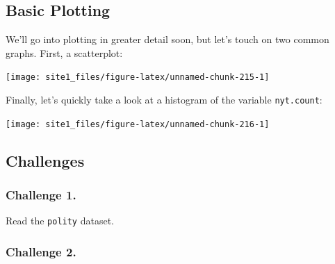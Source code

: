 \documentclass[]{book}
\newenvironment{Shaded}{\begin{snugshade}}{\end{snugshade}}
\newcommand{\DataTypeTok}[1]{\textcolor[rgb]{0.13,0.29,0.53}{#1}}
\newcommand{\DecValTok}[1]{\textcolor[rgb]{0.00,0.00,0.81}{#1}}
\newcommand{\KeywordTok}[1]{\textcolor[rgb]{0.13,0.29,0.53}{\textbf{#1}}}
\newcommand{\NormalTok}[1]{#1}
\newcommand{\OperatorTok}[1]{\textcolor[rgb]{0.81,0.36,0.00}{\textbf{#1}}}
\newcommand{\StringTok}[1]{\textcolor[rgb]{0.31,0.60,0.02}{#1}}
\begin{document}
\hypertarget{basic-plotting}{%
\subsection{Basic Plotting}\label{basic-plotting}}

We'll go into plotting in greater detail soon, but let's touch on two common graphs. First, a scatterplot:

\begin{Shaded}
\end{Shaded}

\begin{center}\texttt{[image: site1\_files/figure-latex/unnamed-chunk-215-1]} \end{center}

Finally, let's quickly take a look at a histogram of the variable \texttt{nyt.count}:

\begin{Shaded}
\end{Shaded}

\begin{center}\texttt{[image: site1\_files/figure-latex/unnamed-chunk-216-1]} \end{center}

\hypertarget{challenges-10}{%
\subsection{Challenges}\label{challenges-10}}

\hypertarget{challenge-1.-5}{%
\subsubsection*{Challenge 1.}\label{challenge-1.-5}}

Read the \texttt{polity} dataset.

\hypertarget{challenge-2.-5}{%
\subsubsection*{Challenge 2.}\label{challenge-2.-5}}
\end{document}
